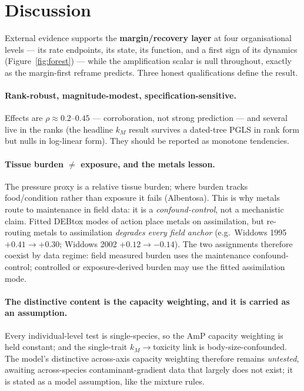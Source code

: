 \section{Discussion}
\label{sec:discussion}

External evidence supports the \textbf{margin/recovery layer} at four organisational levels --- its
rate endpoints, its state, its function, and a first sign of its dynamics (Figure~\ref{fig:forest}) ---
while the amplification scalar is null throughout, exactly as the margin-first reframe predicts. Three honest qualifications
define the result.

\paragraph{Rank-robust, magnitude-modest, specification-sensitive.} Effects are $\rho\approx0.2$--$0.45$
--- corroboration, not strong prediction --- and several live in the ranks (the headline $k_M$ result
survives a dated-tree PGLS in rank form but nulls in log-linear form). They should be reported as
monotone tendencies.

\paragraph{Tissue burden $\neq$ exposure, and the metals lesson.} The pressure proxy is a relative
tissue burden; where burden tracks food/condition rather than exposure it fails (Albentosa). This is why
metals route to maintenance in field data: it is a \emph{confound-control}, not a mechanistic claim.
Fitted DEBtox modes of action place metals on assimilation, but re-routing metals to assimilation
\emph{degrades every field anchor} (e.g.\ Widdows 1995 ${+}0.41\to{+}0.30$; Widdows 2002
${+}0.12\to{-}0.14$). The two assignments therefore coexist by data regime: field measured burden uses
the maintenance confound-control; controlled or exposure-derived burden may use the fitted assimilation
mode.

\paragraph{The distinctive content is the capacity weighting, and it is carried as an assumption.}
Every individual-level test is single-species, so the AmP capacity weighting is held constant; and the
single-trait $k_M\to$toxicity link is body-size-confounded. The model's distinctive across-axis
capacity weighting therefore remains \emph{untested}, awaiting across-species contaminant-gradient data
that largely does not exist; it is stated as a model assumption, like the mixture rules.

